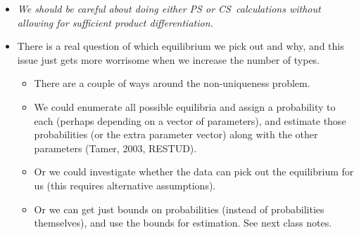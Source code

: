 \begin{frame}%


\begin{itemize}
\item \textit{We should be careful about doing either PS or CS\ calculations
without allowing for sufficient product differentiation. }

\item There is a real question of which equilibrium we pick out and why, and
this issue just gets more worrisome when we increase the number of types.

\begin{itemize}
\item There are a couple of ways around the non-uniqueness problem.

\item We could enumerate all possible equilibria and assign a probability to
each (perhaps depending on a vector of parameters), and estimate those
probabilities (or the extra parameter vector) along with the other
parameters (Tamer, 2003, RESTUD).

\item Or we could investigate whether the data can pick out the equilibrium
for us (this requires alternative assumptions).

\item Or we can get just bounds on probabilities (instead of probabilities
themselves), and use the bounds for estimation. See next class notes.
\end{itemize}
\end{itemize}

\end{frame}%


